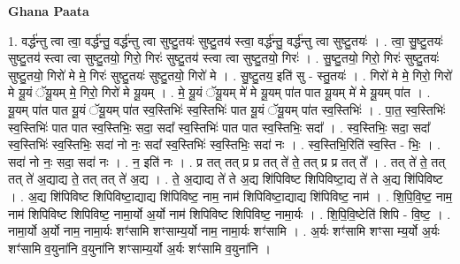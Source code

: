 \documentclass[17pt]{extarticle}
\begin{document}
\textbf{Ghana Paata } \newline

1. वर्द्ध॑न्तु त्वा त्वा॒ वर्द्ध॑न्तु॒ वर्द्ध॑न्तु त्वा सुष्टु॒तयः॑ सुष्टु॒तय॑ स्त्वा॒ वर्द्ध॑न्तु॒ वर्द्ध॑न्तु त्वा सुष्टु॒तयः॑ । . त्वा॒ सु॒ष्टु॒तयः॑ सुष्टु॒तय॑ स्त्वा त्वा सुष्टु॒तयो॒ गिरो॒ गिरः॑ सुष्टु॒तय॑ स्त्वा त्वा सुष्टु॒तयो॒ गिरः॑ । . सु॒ष्टु॒तयो॒ गिरो॒ गिरः॑ सुष्टु॒तयः॑ सुष्टु॒तयो॒ गिरो॑ मे मे॒ गिरः॑ सुष्टु॒तयः॑ सुष्टु॒तयो॒ गिरो॑ मे । . सु॒ष्टु॒तय॒ इति॑ सु - स्तु॒तयः॑ । . गिरो॑ मे मे॒ गिरो॒ गिरो॑ मे यू॒यं ॅयू॒यम् मे॒ गिरो॒ गिरो॑ मे यू॒यम् । . मे॒ यू॒यं ॅयू॒यम् मे॑ मे यू॒यम् पा॑त पात यू॒यम् मे॑ मे यू॒यम् पा॑त । . यू॒यम् पा॑त पात यू॒यं ॅयू॒यम् पा॑त स्व॒स्तिभिः॑ स्व॒स्तिभिः॑ पात यू॒यं ॅयू॒यम् पा॑त स्व॒स्तिभिः॑ । . पा॒त॒ स्व॒स्तिभिः॑ स्व॒स्तिभिः॑ पात पात स्व॒स्तिभिः॒ सदा॒ सदा᳚ स्व॒स्तिभिः॑ पात पात स्व॒स्तिभिः॒ सदा᳚ । . स्व॒स्तिभिः॒ सदा॒ सदा᳚ स्व॒स्तिभिः॑ स्व॒स्तिभिः॒ सदा॑ नो नः॒ सदा᳚ स्व॒स्तिभिः॑ स्व॒स्तिभिः॒ सदा॑ नः । . स्व॒स्तिभि॒रिति॑ स्व॒स्ति - भिः॒ । . सदा॑ नो नः॒ सदा॒ सदा॑ नः । . न॒ इति॑ नः । . प्र तत् तत् प्र प्र तत् ते॑ ते॒ तत् प्र प्र तत् ते᳚ । . तत् ते॑ ते॒ तत् तत् ते॑ अ॒द्याद्य ते॒ तत् तत् ते॑ अ॒द्य । . ते॒ अ॒द्याद्य ते॑ ते अ॒द्य शि॑पिविष्ट शिपिविष्टा॒द्य ते॑ ते अ॒द्य शि॑पिविष्ट । . अ॒द्य शि॑पिविष्ट शिपिविष्टा॒द्याद्य शि॑पिविष्ट॒ नाम॒ नाम॑ शिपिविष्टा॒द्याद्य शि॑पिविष्ट॒ नाम॑ । . शि॒पि॒वि॒ष्ट॒ नाम॒ नाम॑ शिपिविष्ट शिपिविष्ट॒ नामा॒र्यो अ॒र्यो नाम॑ शिपिविष्ट शिपिविष्ट॒ नामा॒र्यः । . शि॒पि॒वि॒ष्टेति॑ शिपि - वि॒ष्ट॒ । . नामा॒र्यो अ॒र्यो नाम॒ नामा॒र्यः शꣳ॑सामि शꣳसाम्य॒र्यो नाम॒ नामा॒र्यः शꣳ॑सामि । . अ॒र्यः शꣳ॑सामि शꣳसा म्य॒र्यो अ॒र्यः शꣳ॑सामि व॒युना॑नि व॒युना॑नि शꣳसाम्य॒र्यो अ॒र्यः शꣳ॑सामि व॒युना॑नि । \newline
\end{document}
